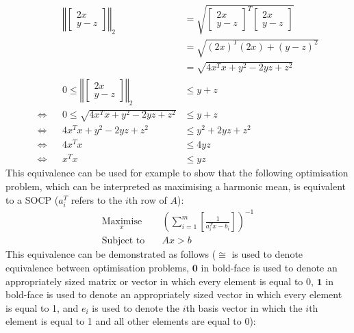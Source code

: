 \begin{align*}
    && \left\Vert\begin{bmatrix}
        2x \\
        y - z
    \end{bmatrix}\right\Vert_2 &= \sqrt{\begin{bmatrix}
        2x \\
        y - z
    \end{bmatrix}^T \begin{bmatrix}
        2x \\
        y - z
    \end{bmatrix}} \\
    && &= \sqrt{(2x)^T(2x) + (y-z)^2} \\
    && &= \sqrt{4x^T x + y^2 - 2yz + z^2} \\
    && 0 \le \left\Vert\begin{bmatrix}
        2x \\
        y - z
    \end{bmatrix}\right\Vert_2 &\le y + z \\
    \Leftrightarrow && 0 \le \sqrt{4x^T x + y^2 - 2yz + z^2} &\le y + z \\
    \Leftrightarrow && 4x^T x + y^2 - 2yz + z^2 &\le y^2 + 2yz + z^2 \\
    \Leftrightarrow && 4x^T x &\le 4yz \\
    \Leftrightarrow && x^T x &\le yz
\end{align*}
This equivalence can be used for example to show that the following optimisation problem, which can be interpreted as maximising a harmonic mean, is equivalent to a SOCP ($a_i^T$ refers to the $i$th row of $A$):
\begin{equation}
\begin{aligned}
    \underset{x}{\text{Maximise}} \quad & \left( \sum_{i=1}^{m}\left[ \frac{1}{a_i^T x - b_i} \right] \right)^{-1} \\
    \text{Subject to} \quad & Ax > b
\end{aligned}
\end{equation}
This equivalence can be demonstrated as follows ($\cong$ is used to denote equivalence between optimisation problems, $\textbf{0}$ in bold-face is used to denote an appropriately sized matrix or vector in which every element is equal to 0, $\textbf{1}$ in bold-face is used to denote an appropriately sized vector in which every element is equal to 1, and $e_i$ is used to denote the $i$th basis vector in which the $i$th element is equal to 1 and all other elements are equal to 0):
